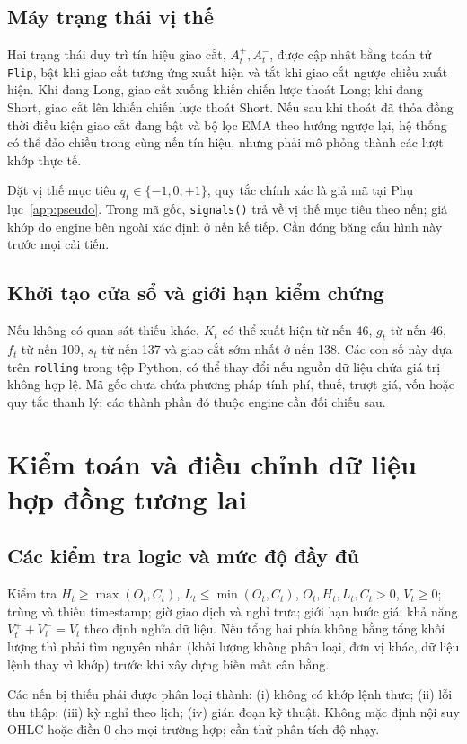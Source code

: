 \documentclass[12pt,a4paper,oneside]{article}
\begin{document}
\subsection{Máy trạng thái vị thế}
Hai trạng thái duy trì tín hiệu giao cắt, $A_t^+,A_t^-$, được cập nhật bằng toán tử \texttt{Flip}, bật khi giao cắt tương ứng xuất hiện và tắt khi giao cắt ngược chiều xuất hiện. Khi đang Long, giao cắt xuống khiến chiến lược thoát Long; khi đang Short, giao cắt lên khiến chiến lược thoát Short. Nếu sau khi thoát đã thỏa đồng thời điều kiện giao cắt đang bật và bộ lọc EMA theo hướng ngược lại, hệ thống có thể đảo chiều trong cùng nến tín hiệu, nhưng phải mô phỏng thành các lượt khớp thực tế.

Đặt vị thế mục tiêu $q_t\in\{-1,0,+1\}$, quy tắc chính xác là giả mã tại Phụ lục~\ref{app:pseudo}. Trong mã gốc, \texttt{signals()} trả về vị thế mục tiêu theo nến; giá khớp do engine bên ngoài xác định ở nến kế tiếp. Cần đóng băng cấu hình này trước mọi cải tiến.

\subsection{Khởi tạo cửa sổ và giới hạn kiểm chứng}
Nếu không có quan sát thiếu khác, $K_t$ có thể xuất hiện từ nến 46, $g_t$ từ nến 46, $f_t$ từ nến 109, $s_t$ từ nến 137 và giao cắt sớm nhất ở nến 138. Các con số này dựa trên \texttt{rolling} trong tệp Python, có thể thay đổi nếu nguồn dữ liệu chứa giá trị không hợp lệ. Mã gốc chưa chứa phương pháp tính phí, thuế, trượt giá, vốn hoặc quy tắc thanh lý; các thành phần đó thuộc engine cần đối chiếu sau.

\section{Kiểm toán và điều chỉnh dữ liệu hợp đồng tương lai}
\subsection{Các kiểm tra logic và mức độ đầy đủ}
Kiểm tra $H_t\geq\max(O_t,C_t)$, $L_t\leq\min(O_t,C_t)$, $O_t,H_t,L_t,C_t>0$, $V_t\geq0$; trùng và thiếu timestamp; giờ giao dịch và nghỉ trưa; giới hạn bước giá; khả năng $V_t^++V_t^-=V_t$ theo định nghĩa dữ liệu. Nếu tổng hai phía không bằng tổng khối lượng thì phải tìm nguyên nhân (khối lượng không phân loại, đơn vị khác, dữ liệu lệnh thay vì khớp) trước khi xây dựng biến mất cân bằng.

Các nến bị thiếu phải được phân loại thành: (i) không có khớp lệnh thực; (ii) lỗi thu thập; (iii) kỳ nghỉ theo lịch; (iv) gián đoạn kỹ thuật. Không mặc định nội suy OHLC hoặc điền 0 cho mọi trường hợp; cần thử phân tích độ nhạy.
\end{document}
